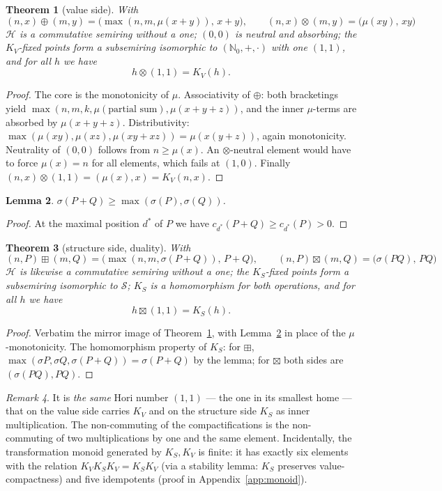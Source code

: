 \documentclass[11pt]{article}
\newtheorem{satz}{Theorem}[section]
\newtheorem{lemma}[satz]{Lemma}
\theoremstyle{definition}
\theoremstyle{remark}
\newtheorem{bemerkung}[satz]{Remark}
\newcommand{\Hori}{\mathcal H}
\newcommand{\Struk}{\mathcal S}
\newcommand{\NN}{\mathbb N_0}
\newcommand{\KV}{K_V}
\newcommand{\KS}{K_S}
\begin{document}
\begin{satz}[value side]\label{satz:wertseite}
With
\[
(n,x)\oplus(m,y)=\bigl(\max(n,m,\mu(x{+}y)),\,x{+}y\bigr),
\qquad
(n,x)\otimes(m,y)=\bigl(\mu(xy),\,xy\bigr)
\]
$\Hori$ is a commutative semiring without a one; $(0,0)$ is neutral
and absorbing; the $\KV$-fixed points form a subsemiring isomorphic
to $(\NN,+,\cdot)$ with one $(1,1)$, and for all $h$ we have
\[
h\otimes(1,1)=\KV(h).
\]
\end{satz}

\begin{proof}
The core is the monotonicity of $\mu$. Associativity of $\oplus$:
both bracketings yield
$\max(n,m,k,\mu(\text{partial sum}),\mu(x{+}y{+}z))$, and the inner
$\mu$-terms are absorbed by $\mu(x{+}y{+}z)$. Distributivity:
$\max(\mu(xy),\mu(xz),\mu(xy{+}xz))=\mu(x(y{+}z))$, again
monotonicity. Neutrality of $(0,0)$ follows from $n\ge\mu(x)$. An
$\otimes$-neutral element would have to force $\mu(x)=n$ for all
elements, which fails at $(1,0)$. Finally
$(n,x)\otimes(1,1)=(\mu(x),x)=\KV(n,x)$.
\end{proof}

\begin{lemma}\label{lem:sigmamono}
$\sigma(P+Q)\ge\max(\sigma(P),\sigma(Q))$.
\end{lemma}

\begin{proof}
At the maximal position $d^*$ of $P$ we have
$c_{d^*}(P{+}Q)\ge c_{d^*}(P)>0$.
\end{proof}

\begin{satz}[structure side, duality]\label{satz:dualitaet}
With
\[
(n,P)\boxplus(m,Q)=\bigl(\max(n,m,\sigma(P{+}Q)),\,P{+}Q\bigr),
\qquad
(n,P)\boxtimes(m,Q)=\bigl(\sigma(PQ),\,PQ\bigr)
\]
$\Hori$ is likewise a commutative semiring without a one; the
$\KS$-fixed points form a subsemiring isomorphic to $\Struk$;
$\KS$ is a homomorphism for both operations, and for all $h$ we
have
\[
h\boxtimes(1,1)=\KS(h).
\]
\end{satz}

\begin{proof}
Verbatim the mirror image of Theorem~\ref{satz:wertseite}, with
Lemma~\ref{lem:sigmamono} in place of the $\mu$-monotonicity. The
homomorphism property of $\KS$: for $\boxplus$,
$\max(\sigma P,\sigma Q,\sigma(P{+}Q))=\sigma(P{+}Q)$ by the
lemma; for $\boxtimes$ both sides are
$(\sigma(PQ),PQ)$.
\end{proof}

\begin{bemerkung}
It is \emph{the same} Hori number $(1,1)$ --- the one in its
smallest home --- that on the value side carries $\KV$ and on the
structure side $\KS$ as inner multiplication. The non-commuting of
the compactifications is the non-commuting of two multiplications
by one and the same element. Incidentally, the transformation
monoid generated by $\KS,\KV$ is finite: it has exactly six
elements with the relation
$\KV\KS\KV=\KS\KV$ (via a stability lemma: $\KS$ preserves
value-compactness) and five idempotents
(proof in Appendix~\ref{app:monoid}).
\end{bemerkung}
\end{document}
